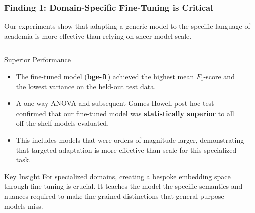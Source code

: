 \documentclass[aspectratio=169,10pt]{beamer}
\begin{document}
\begin{frame}
    \frametitle{Finding 1: Domain-Specific Fine-Tuning is Critical}
    
    Our experiments show that adapting a generic model to the specific language of academia is more effective than relying on sheer model scale.

    \fontsize{9}{9}\selectfont
    \begin{columns}[T]
        \begin{column}{0.5\textwidth}
            \begin{block}{\small Superior Performance}
                \begin{itemize}
                    \item The fine-tuned model (\textbf{bge-ft}) achieved the highest mean \(F_1\)-score and the lowest variance on the held-out test data.
                    \item A one-way ANOVA and subsequent Games-Howell post-hoc test confirmed that our fine-tuned model was \textbf{statistically superior} to all off-the-shelf models evaluated.
                    \item This includes models that were orders of magnitude larger, demonstrating that targeted adaptation is more effective than scale for this specialized task.
                \end{itemize}
            \end{block}
            
            \begin{alertblock}{\small Key Insight}
                For specialized domains, creating a bespoke embedding space through fine-tuning is crucial. It teaches the model the specific semantics and nuances required to make fine-grained distinctions that general-purpose models miss.
            \end{alertblock}
        \end{column}
        
        \begin{column}{0.5\textwidth}
            

\end{column}
\end{columns}
\end{frame}
\end{document}
